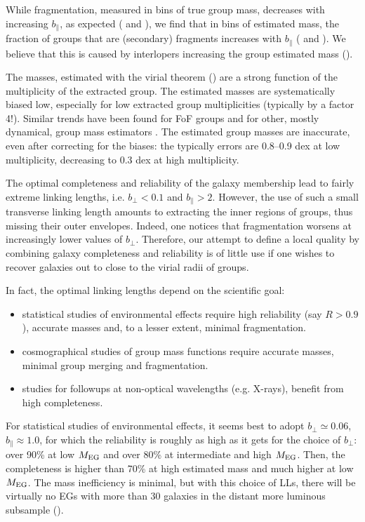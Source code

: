 While fragmentation, measured in bins of true group mass, decreases with
increasing $b_\parallel$, as expected ( and
), we find that in bins of estimated mass, the
fraction of groups that are (secondary) fragments increases with $b_\parallel$
( and ).
We believe that this is caused by interlopers increasing the group estimated
mass ().

The masses, estimated with the virial theorem () are a
strong function of the multiplicity of the extracted group. The estimated
masses are systematically biased low, especially for low extracted group
multiplicities (typically by a factor 4!). Similar trends have been found for
FoF groups \citep{Robotham+11} and for other, mostly dynamical, group mass
estimators \citep{Old+14}. The estimated group masses are inaccurate, even
after correcting for the biases: the typically errors are 0.8--0.9 dex at low
multiplicity, decreasing to 0.3 dex at high multiplicity.

The optimal completeness and reliability of the galaxy membership lead to
fairly extreme linking lengths, i.e. $b_\perp < 0.1$ and $b_\parallel > 2$.
However, the use of such a small transverse linking length amounts to
extracting the inner regions of groups, thus missing their outer envelopes.
Indeed, one notices that fragmentation worsens at increasingly lower values of
$b_\perp$. Therefore, our attempt to define a local quality by combining galaxy
completeness and reliability is of little use if one wishes to recover galaxies
out to close to the virial radii of groups.

In fact, the optimal linking lengths depend on the scientific goal:
%
\begin{itemize}
    \item statistical studies of environmental effects require high reliability
        (say $R>  0.9$), accurate masses and, to a lesser extent, minimal
        fragmentation.
    \item cosmographical studies of group mass functions require accurate
        masses, minimal group merging and fragmentation.
    \item studies for followups at non-optical wavelengths (e.g. X-rays),
        benefit from high completeness.
\end{itemize}

For statistical studies of environmental effects, it seems best to adopt
$b_\perp \simeq 0.06$, $b_\parallel \approx 1.0$, for which the reliability is
roughly as high as it gets for the choice of $b_\perp$: over 90\% at low
$M_{\rm EG}$ and over 80\% at intermediate and high $M_{\rm EG}$. Then,  the
completeness is higher than 70\% at high estimated mass and much higher at low
$M_{\rm EG}$. The mass inefficiency is minimal, but with this choice of LLs,
there will be virtually no EGs with more than 30 galaxies in the distant more
luminous subsample ().

